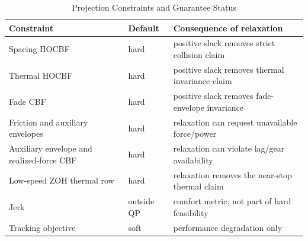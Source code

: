\begin{table}[t]
\caption{Projection Constraints and Guarantee Status}
\label{tab:constraints}
\centering\normalsize
\begin{tabular}{@{}>{\raggedright\arraybackslash}p{}>{\raggedright\arraybackslash}p{}>{\raggedright\arraybackslash}p{}@{}}
\toprule
Constraint & Default & Consequence of relaxation \\
\midrule
Spacing HOCBF & hard & positive slack removes strict collision claim \\
Thermal HOCBF & hard & positive slack removes thermal invariance claim \\
Fade CBF & hard & positive slack removes fade-envelope invariance \\
Friction and auxiliary envelopes & hard & relaxation can request unavailable force/power \\
Auxiliary envelope and realized-force CBF & hard & relaxation can violate lag/gear availability \\
Low-speed ZOH thermal row & hard & relaxation removes the near-stop thermal claim \\
Jerk & outside QP & comfort metric; not part of hard feasibility \\
Tracking objective & soft & performance degradation only \\
\bottomrule
\end{tabular}
\end{table}
